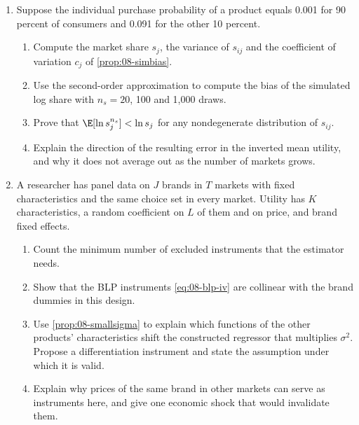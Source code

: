 \begin{enumerate}[label=\arabic*., leftmargin=*, itemsep=6pt]
\item Suppose the individual purchase probability of a product equals 0.001 for 90 percent of consumers and 0.091
for the other 10 percent.
\begin{enumerate}[label=(\alph*)]
  \item Compute the market share $s_j$, the variance of $s_{ij}$ and the coefficient of variation $c_j$ of
  \cref{prop:08-simbias}.
  \item Use the second-order approximation to compute the bias of the simulated log share with $n_s = 20$, 100 and
  1,000 draws.
  \item Prove that $\E[\ln s^{n_s}_j] < \ln s_j$ for any nondegenerate distribution of $s_{ij}$.
  \item Explain the direction of the resulting error in the inverted mean utility, and why it does not average
  out as the number of markets grows.
\end{enumerate}

\item A researcher has panel data on $J$ brands in $T$ markets with fixed characteristics and the same choice set
in every market. Utility has $K$ characteristics, a random coefficient on $L$ of them and on price, and brand
fixed effects.
\begin{enumerate}[label=(\alph*)]
  \item Count the minimum number of excluded instruments that the estimator needs.
  \item Show that the BLP instruments \eqref{eq:08-blp-iv} are collinear with the brand dummies in this design.
  \item Use \cref{prop:08-smallsigma} to explain which functions of the other products' characteristics shift the
  constructed regressor that multiplies $\sigma^2$. Propose a differentiation instrument and state the assumption
  under which it is valid.
  \item Explain why prices of the same brand in other markets can serve as instruments here, and give one economic
  shock that would invalidate them.
\end{enumerate}


\end{enumerate}
